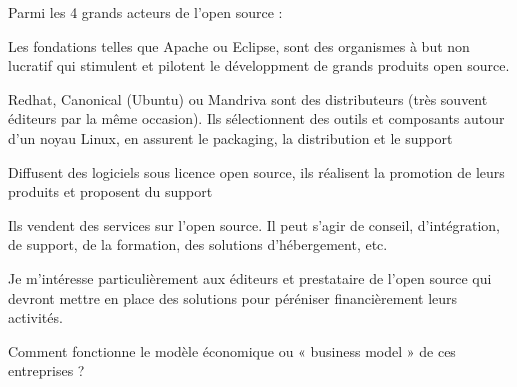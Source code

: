 	Parmi les 4 grands acteurs de l'open source : 
	\begin{description}[font=\color{burntorange}]
	\item[Fondation:] Les fondations telles que Apache ou Eclipse, sont des organismes à but non lucratif qui stimulent et pilotent le développment de grands produits open source.
	\item[Distributeur:] Redhat, Canonical (Ubuntu) ou Mandriva sont des distributeurs (très souvent éditeurs par la même occasion). Ils sélectionnent des outils et composants autour d'un noyau Linux, en assurent le packaging, la distribution et le support
	\item[Éditeurs:] Diffusent des logiciels sous licence open source, ils réalisent la promotion de leurs produits et proposent du support
	\item[Prestataires: ] Ils vendent des services sur l'open source. Il peut s'agir de conseil, d'intégration, de support, de la formation, des solutions d'hébergement, etc.
	\end{description}

	Je m'intéresse particulièrement aux éditeurs et prestataire de l'open source qui devront mettre en place des solutions pour péréniser financièrement leurs activités.

	Comment fonctionne le modèle économique ou « business model » de ces entreprises ?

